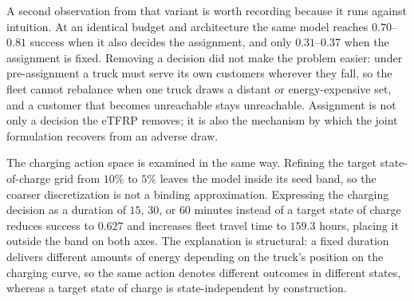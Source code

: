 \documentclass[journal]{IEEEtran}
\begin{document}
A second observation from that variant is worth recording because it runs against intuition. At an identical budget
and architecture the same model reaches $0.70$--$0.81$ success when it also decides the assignment, and only
$0.31$--$0.37$ when the assignment is fixed. Removing a decision did not make the problem easier: under
pre-assignment a truck must serve its own customers wherever they fall, so the fleet cannot rebalance when one truck
draws a distant or energy-expensive set, and a customer that becomes unreachable stays unreachable. Assignment is not
only a decision the eTFRP removes; it is also the mechanism by which the joint formulation recovers from an adverse
draw.

The charging action space is examined in the same way. Refining the target state-of-charge grid from $10\%$ to $5\%$ leaves the model inside its seed band, so the coarser discretization is not a binding approximation. Expressing the charging decision as a duration of $15$, $30$, or $60$ minutes instead of a target state of charge reduces success to $0.627$ and increases fleet travel time to $159.3$ hours, placing it outside the band on both axes. The explanation is structural: a fixed duration delivers different amounts of energy depending on the truck's position on the charging curve, so the same action denotes different outcomes in different states, whereas a target state of charge is state-independent by construction.

{\footnotesize


}
\end{document}
